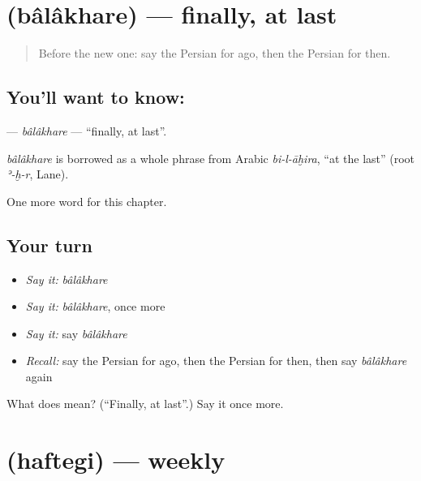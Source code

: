 \section[\texorpdfstring{\fa{بالاخره} (bâlâkhare)}{بالاخره (bâlâkhare)}]{ (bâlâkhare) — finally, at last}

\label{lesson:FA-C153-balakhare}



\begin{quote}
Before the new one: say the Persian for ago, then the Persian for then.
\end{quote}

\subsection*{You'll want to know: }
\textbf{} — \emph{bâlâkhare} — \textquotedblleft{}finally, at last\textquotedblright{}.

\begin{cousinweb}
\emph{bâlâkhare} is borrowed as a whole phrase from Arabic \emph{bi-l-āḫira}, \textquotedblleft{}at the last\textquotedblright{} (root \emph{ʾ-ḫ-r}, Lane).
\end{cousinweb}

\begin{grammarlens}[title={What you've built}]
One more word for this chapter.
\end{grammarlens}

\subsection*{Your turn}
\begin{itemize}
\raggedright
  \item \emph{Say it:} \emph{bâlâkhare}
  \item \emph{Say it:} \emph{bâlâkhare}, once more
  \item \emph{Say it:} say \emph{bâlâkhare}
  \item \emph{Recall:} say the Persian for ago, then the Persian for then, then say \emph{bâlâkhare} again
\end{itemize}

\begin{tcolorbox}[breakable,colback=teal!4,colframe=teal!35!black,title={Before you move on}]
What does  mean? (\textquotedblleft{}Finally, at last\textquotedblright{}.) Say it once more.
\end{tcolorbox}
\section[\texorpdfstring{\fa{هفتگی} (haftegi)}{هفتگی (haftegi)}]{ (haftegi) — weekly}


